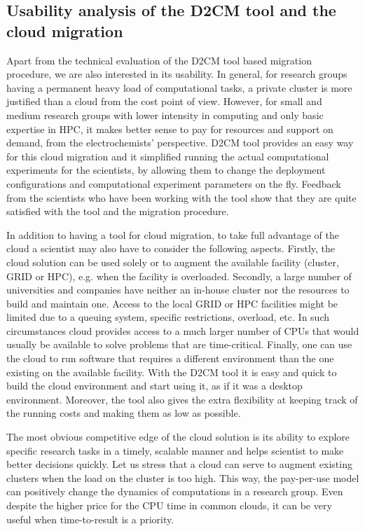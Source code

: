 \documentclass[a4paper,10pt]{article}
\begin{document}
\subsection{Usability analysis of the D2CM tool and the cloud migration}

Apart from the technical evaluation of the D2CM tool based migration procedure, we are also interested in its usability. In general, for research groups having a permanent heavy load of computational tasks, a private cluster is more justified than a cloud from the cost point of view. However, for small and medium research groups with lower intensity in computing and only basic expertise in HPC, it makes better sense to pay for resources and support on demand, from the electrochemists' perspective. D2CM tool provides an easy way for this cloud migration and it simplified running the actual computational experiments for the scientists, by allowing them to change the deployment configurations and computational experiment parameters on the fly. Feedback from the scientists who have been working with the tool show that they are quite satisfied with the tool and the migration procedure. 



In addition to having a tool for cloud migration, to take full advantage of the cloud a scientist may also have to consider the following aspects. Firstly, the cloud solution can be used solely or to augment the available facility (cluster, GRID or HPC), e.g. when the facility is overloaded. Secondly, a large number of universities and companies have neither an in-house cluster nor the resources to build and maintain one. Access to the local GRID or HPC facilities might be limited due to a queuing system, specific restrictions, overload, etc. In such circumstances cloud provides access to a much larger number of CPUs that would usually be available to solve problems that are time-critical. Finally, one can use the cloud to run software that requires a different environment than the one existing on the available facility. With the D2CM tool it is easy and quick to build the cloud environment and start using it, as if it was a desktop environment. Moreover, the tool also gives the extra flexibility at keeping track of the running costs and making them as low as possible.

The most obvious competitive edge of the cloud solution is its ability to explore specific research tasks in a timely, scalable manner and helps scientist to make better decisions quickly. Let us stress that a cloud can serve to augment existing clusters when the load on the cluster is too high. This way, the pay-per-use model can positively change the dynamics of computations in a research group. Even despite the higher price for the CPU time in common clouds, it can be very useful when time-to-result is a priority.
\end{document}
